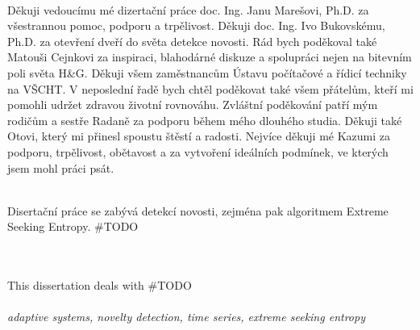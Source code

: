  \vspace*{\fill}
  \\ [5mm]
Děkuji vedoucímu mé dizertační práce doc. Ing. Janu Marešovi, Ph.D. za všestrannou pomoc, podporu a trpělivost. Děkuji doc. Ing. Ivo Bukovskému, Ph.D.  za otevření dveří do světa detekce novosti. Rád bych poděkoval také Matouši Cejnkovi za inspiraci, blahodárné diskuze a spolupráci nejen na bitevním poli světa H\&G. Děkuji všem zaměstnancům Ústavu počítačové a řídicí techniky na VŠCHT. V neposlední řadě bych chtěl poděkovat také všem přátelům, kteří mi pomohli udržet zdravou životní rovnováhu. Zvláštní poděkování patří  mým rodičům a sestře Radaně za podporu během mého dlouhého studia. Děkuji také Otovi, který mi přinesl spoustu štěstí a radosti. Nejvíce děkuji mé Kazumi za podporu, trpělivost, obětavost a za vytvoření ideálních podmínek, ve kterých jsem mohl práci psát.  

 





\cleardoublepage
\thispagestyle{empty}

 \\ [5mm]
Disertační práce se zabývá detekcí novosti, zejména pak algoritmem Extreme Seeking Entropy. \#TODO \\ [5mm]
  \\ [5mm] 


\cleardoublepage
\thispagestyle{empty}


\cleardoublepage
\thispagestyle{empty}

 \\ [5mm] 
This dissertation deals with \#TODO
\\ [5mm]



  \\ [5mm]
{\it adaptive systems, novelty detection, time series, extreme seeking entropy}




\cleardoublepage
\tableofcontents
\thispagestyle{empty}

